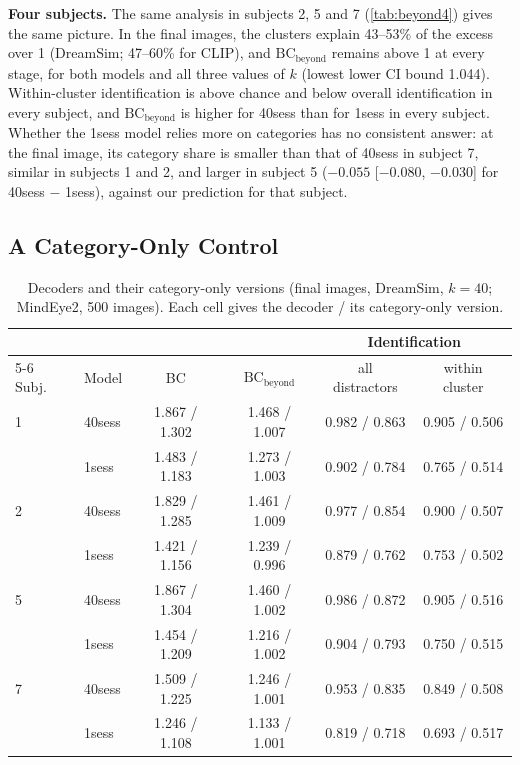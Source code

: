 \documentclass[11pt,a4paper]{article}
\begin{document}
\textbf{Four subjects.} The same analysis in subjects 2, 5 and 7
(\cref{tab:beyond4}) gives the same picture. In the final images, the clusters
explain 43--53\% of the excess over 1 (DreamSim; 47--60\% for CLIP), and
$\mathrm{BC}_\text{beyond}$ remains above 1 at every stage, for both models and
all three values of $k$ (lowest lower CI bound 1.044). Within-cluster
identification is above chance and below overall identification in every
subject, and $\mathrm{BC}_\text{beyond}$ is higher for 40sess than for 1sess in
every subject. Whether the 1sess model relies more on categories has no
consistent answer: at the final image, its category share is smaller than that
of 40sess in subject 7, similar in subjects 1 and 2, and larger in subject 5
($-0.055$ [$-0.080$, $-0.030$] for 40sess $-$ 1sess), against our prediction
for that subject.

\subsection{A Category-Only Control}
\label{sec:nsd-catonly}

\begin{table}[tbp]
\centering
\caption{Decoders and their category-only versions (final images, DreamSim,
  $k=40$; MindEye2, 500 images). Each cell gives the decoder / its
  category-only version.}
\label{tab:catonly}
\footnotesize
\setlength{\tabcolsep}{4pt}
\begin{tabular}{llcccc}
\toprule
 & & & & \multicolumn{2}{c}{Identification} \\
\cmidrule(lr){5-6}
Subj. & Model & BC & $\mathrm{BC}_\text{beyond}$ & all distractors & within cluster \\
\midrule
1 & 40sess & 1.867 / 1.302 & 1.468 / 1.007 & 0.982 / 0.863 & 0.905 / 0.506 \\
  & 1sess  & 1.483 / 1.183 & 1.273 / 1.003 & 0.902 / 0.784 & 0.765 / 0.514 \\
2 & 40sess & 1.829 / 1.285 & 1.461 / 1.009 & 0.977 / 0.854 & 0.900 / 0.507 \\
  & 1sess  & 1.421 / 1.156 & 1.239 / 0.996 & 0.879 / 0.762 & 0.753 / 0.502 \\
5 & 40sess & 1.867 / 1.304 & 1.460 / 1.002 & 0.986 / 0.872 & 0.905 / 0.516 \\
  & 1sess  & 1.454 / 1.209 & 1.216 / 1.002 & 0.904 / 0.793 & 0.750 / 0.515 \\
7 & 40sess & 1.509 / 1.225 & 1.246 / 1.001 & 0.953 / 0.835 & 0.849 / 0.508 \\
  & 1sess  & 1.246 / 1.108 & 1.133 / 1.001 & 0.819 / 0.718 & 0.693 / 0.517 \\
\bottomrule
\end{tabular}
\end{table}
\end{document}
